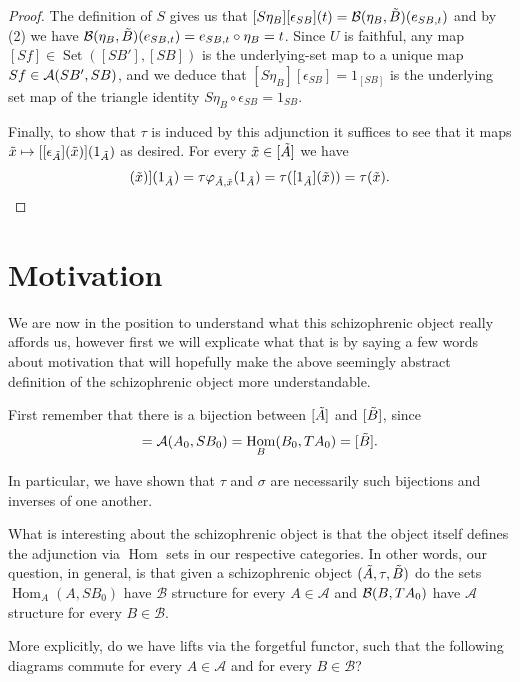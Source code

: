 \documentclass[12pt,a4paper]{article}
\DeclareMathOperator{\Hom}{Hom}
\DeclareMathOperator{\Set}{Set}
\def\HomA{\ensuremath\mathcal{A}}
\def\HomB{\ensuremath\mathcal{B}}
\def\t{\ensuremath\tilde}
\begin{document}
\begin{proof}
The definition of $S$ gives us that $[S\eta_B][\epsilon_{SB}](t) = \HomB(\eta_B, \t B)(e_{SB, t})$ and by (2) we have $\HomB(\eta_B, \t B)(e_{SB, t}) = e_{SB,t} \circ \eta_B = t$. Since $U$ is faithful, any map $[Sf] \in \Set([SB'], [SB])$ is the underlying-set map to a unique map $Sf \in \HomA(SB', SB)$, and we deduce that $[S\eta_B][\epsilon_{SB}] = 1_{[SB]}$ is the underlying set map of the triangle identity $S\eta_B \circ \epsilon_{SB} = 1_{SB}$.

Finally, to show that $\tau$ is induced by this adjunction it suffices to see that it maps $\t x \mapsto [[\epsilon_{\t A}](\t x)](1_{\t A})$ as desired. For every $\t x \in [\t A]$ we have
\begin{align*}
	[[\epsilon_{\t A}](\t x)](1_{\t A}) = \tau \varphi_{\t A, \t x}(1_{\t A}) = \tau([1_{\t A}](\t x)) = \tau(\t x).
\end{align*}
\end{proof}
\section{Motivation}
We are now in the position to understand what this schizophrenic object really affords us, however first we will explicate what that is by  saying a few words about motivation that will hopefully make the above seemingly abstract definition of the schizophrenic object more understandable. 

First remember that there is a bijection between $[\t A]$ and $[\t B]$, since  \begin{align*}
	[\t A] = \HomA(A_0, SB_0) = \Hom_B(B_0, TA_0) = [\t B].
\end{align*}

In particular, we have shown that $\tau$ and $\sigma$ are necessarily such bijections and inverses of one another. 

What is interesting about the schizophrenic object is that the object itself defines the adjunction via $\Hom$ sets in our respective categories. In other words, our question, in general, is that given a schizophrenic object $(\t A, \tau, \t B)$ do the sets $\Hom_A(A, SB_0)$ have $\mathcal{B}$ structure for every $A \in \mathcal{A}$ and $\HomB(B, TA_0)$ have $\mathcal{A}$ structure for every $B \in \mathcal{B}$. 

More explicitly, do we have lifts via the forgetful functor, such that the following diagrams commute for every $A \in \mathcal{A}$ and for every $B \in \mathcal{B}$?
\end{document}
